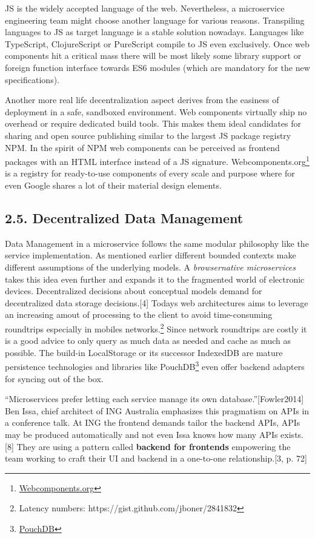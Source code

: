 \documentclass[]{article}
\begin{document}
JS is the widely accepted language of the web. Nevertheless, a
microservice engineering team might choose another language for various
reasons. Transpiling languages to JS as target language is a stable
solution nowadays. Languages like TypeScript, ClojureScript or
PureScript compile to JS even exclusively. Once web components hit a
critical mass there will be most likely some library support or foreign
function interface towards ES6 modules (which are mandatory for the new
specifications).

Another more real life decentralization aspect derives from the easiness
of deployment in a safe, sandboxed environment. Web components virtually
ship no overhead or require dedicated build tools. This makes them ideal
candidates for sharing and open source publishing similar to the largest
JS package registry NPM. In the spirit of NPM web components can be
perceived as frontend packages with an HTML interface instead of a JS
signature. Webcomponents.org\footnote{\href{https://webcomponents.org}{Webcomponents.org}}
is a registry for ready-to-use components of every scale and purpose
where for even Google shares a lot of their material design elements.

\subsection{2.5. Decentralized Data
Management}\label{decentralized-data-management}

Data Management in a microservice follows the same modular philosophy
like the service implementation. As mentioned earlier different bounded
contexts make different assumptions of the underlying models. A
\emph{browsernative microservices} takes this idea even further and
expands it to the fragmented world of electronic devices. Decentralized
decisions about conceptual models demand for decentralized data storage
decisions.{[}4{]} Todays web architectures aims to leverage an
increasing amout of processing to the client to avoid time-consuming
roundtrips especially in mobiles networks.\footnote{Latency numbers:
  https://gist.github.com/jboner/2841832} Since network roundtrips are
costly it is a good advice to only query as much data as needed and
cache as much as possible. The build-in LocalStorage or its successor
IndexedDB are mature persistence technologies and libraries like
PouchDB\footnote{\href{https://pouchdb.com/}{PouchDB}} even offer
backend adapters for syncing out of the box.

``Microservices prefer letting each service manage its own
database.''{[}Fowler2014{]} Ben Issa, chief architect of ING Australia
emphasizes this pragmatism on APIs in a conference talk. At ING the
frontend demands tailor the backend APIs, APIs may be produced
automatically and not even Issa knows how many APIs exists.{[}8{]} They
are using a pattern called \textbf{backend for frontends} empowering the
team working to craft their UI and backend in a one-to-one
relationship.{[}3, p. 72{]}
\end{document}
